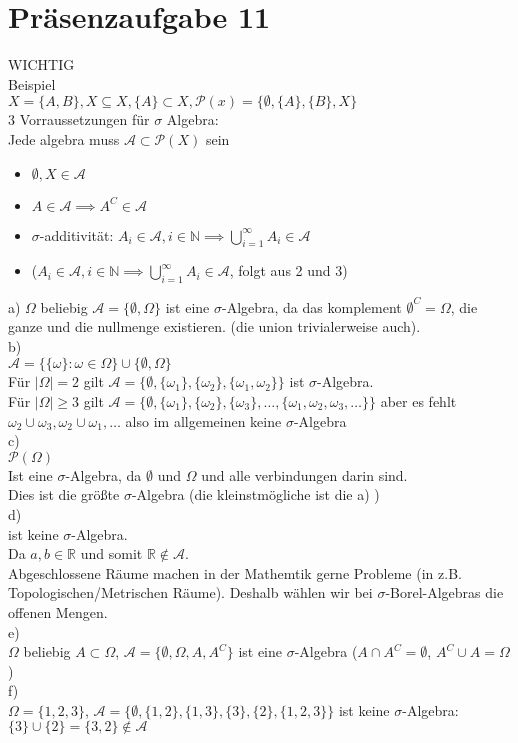 \documentclass{article}
\begin{document}
	\section{Präsenzaufgabe 11}
	WICHTIG\\
	Beispiel\\
	$X=\{A,B\},X\subseteq X,\{A\}\subset X, \mathcal{P}(x)=\{\emptyset,\{A\},\{B\},X\}$\\
	3 Vorraussetzungen für $\sigma$ Algebra:\\
	Jede algebra muss $\mathcal{A}\subset \mathcal{P}(X)$ sein\\
	\begin{itemize}
		\item $\emptyset,X\in\mathcal{A}$
		\item $A\in \mathcal{A}\implies A^C\in\mathcal{A}$
		\item $\sigma$-additivität: $A_i\in\mathcal{A},i\in\mathbb{N} \implies \bigcup\limits^\infty_{i=1} A_i \in\mathcal{A}$
		\item ($A_i\in\mathcal{A}, i\in\mathbb{N}\implies \bigcup\limits^\infty_{i=1}A_i\in\mathcal{A}$, folgt aus 2 und 3)
	\end{itemize}
	a) $\Omega$ beliebig $\mathcal{A}=\{\emptyset,\Omega\}$ ist eine $\sigma$-Algebra, da das komplement $\emptyset^C=\Omega$, die ganze und die nullmenge existieren. (die union trivialerweise auch).\\
	b)\\
	$\mathcal{A} = \{\{\omega\}:\omega\in\Omega\}\cup\{\emptyset,\Omega\}$\\
	Für $|\Omega| = 2$ gilt $\mathcal{A}=\{\emptyset,\{\omega_1\},\{\omega_2\},\{\omega_1,\omega_2\}\}$ ist $\sigma$-Algebra.\\
	Für $|\Omega| \geq 3$ gilt $\mathcal{A}=\{\emptyset,\{\omega_1\},\{\omega_2\},\{\omega_3\},\dots,\{\omega_1,\omega_2,\omega_3,\dots\}\}$  aber es fehlt $\omega_2\cup\omega_3,\omega_2\cup \omega_1,\dots$ also im allgemeinen keine $\sigma$-Algebra\\
	c)\\
	$\mathcal{P}(\Omega)$\\
	Ist eine $\sigma$-Algebra, da $\emptyset$ und $\Omega$ und alle verbindungen darin sind.\\
	Dies ist die größte $\sigma$-Algebra (die kleinstmögliche ist die a) )\\
	d)\\
	ist keine $\sigma$-Algebra.\\
	Da $a,b\in\mathbb{R}$ und somit $\mathbb{R}\notin\mathcal{A}$.\\
	Abgeschlossene Räume machen in der Mathemtik gerne Probleme (in z.B. Topologischen/Metrischen Räume). Deshalb wählen wir bei $\sigma$-Borel-Algebras die offenen Mengen.\\
	e)\\
	$\Omega$ beliebig $A\subset \Omega$, $\mathcal{A} = \{\emptyset,\Omega,A,A^C\}$ ist eine $\sigma$-Algebra ($A\cap A^C=\emptyset$, $A^C\cup A= \Omega$)\\
	f)\\
	$\Omega=\{1,2,3\}$, $\mathcal{A}=\{\emptyset,\{1,2\},\{1,3\},\{3\},\{2\},\{1,2,3\}\}$ ist keine $\sigma$-Algebra: $\{3\}\cup\{2\}=\{3,2\}\notin \mathcal{A}$
\end{document}
